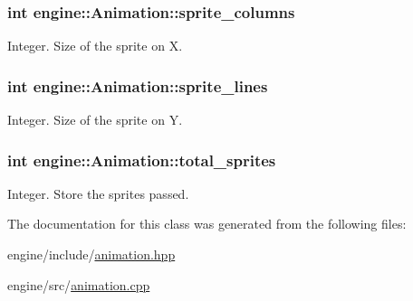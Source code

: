 \subsubsection[{\texorpdfstring{sprite\+\_\+columns}{sprite_columns}}]{\setlength{\rightskip}{0pt plus 5cm}int engine\+::\+Animation\+::sprite\+\_\+columns}\hypertarget{classengine_1_1_animation_a1d20c1eb0b8df2de59c5ccd0934025c7}{}\label{classengine_1_1_animation_a1d20c1eb0b8df2de59c5ccd0934025c7}
Integer. Size of the sprite on X. 
\subsubsection[{\texorpdfstring{sprite\+\_\+lines}{sprite_lines}}]{\setlength{\rightskip}{0pt plus 5cm}int engine\+::\+Animation\+::sprite\+\_\+lines}\hypertarget{classengine_1_1_animation_a84a8973da1406fa64d936d8c8377fec3}{}\label{classengine_1_1_animation_a84a8973da1406fa64d936d8c8377fec3}
Integer. Size of the sprite on Y. 
\subsubsection[{\texorpdfstring{total\+\_\+sprites}{total_sprites}}]{\setlength{\rightskip}{0pt plus 5cm}int engine\+::\+Animation\+::total\+\_\+sprites}\hypertarget{classengine_1_1_animation_a399696657e2466e4680f4b37ae2e6efd}{}\label{classengine_1_1_animation_a399696657e2466e4680f4b37ae2e6efd}
Integer. Store the sprites passed. 

The documentation for this class was generated from the following files\+:\begin{DoxyCompactItemize}
\item 
engine/include/\hyperlink{animation_8hpp}{animation.\+hpp}\item 
engine/src/\hyperlink{animation_8cpp}{animation.\+cpp}\end{DoxyCompactItemize}
